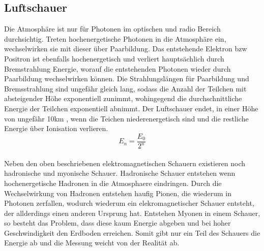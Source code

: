 \subsection{Luftschauer}
Die Atmosphäre ist nur für Photonen im optischen und radio Bereich durchsichtig. Treten hochenergetische Photonen in die Atmosphäre ein, wechselwirken sie mit dieser über Paarbildung. Das entstehende Elektron bzw Positron ist ebenfalls hochenergetisch und verliert hauptsächlich durch Bremstrahlung Energie, worauf die entstehenden Photonen wieder durch Paarbildung wechselwirken können. Die Strahlungslängen für Paarbildung und Bremsstrahlung sind ungefähr gleich lang, sodass die Anzahl der Teilchen mit absteigender Höhe exponentiell zunimmt, wohingegend die durchschnittliche Energie der Teilchen exponentiell abnimmt. Der Luftschauer endet, in einer Höhe von ungefähr 10km 
\cite{iwas}, wenn die Teichen niederenergetisch sind und die restliche Energie über Ionisation verlieren.
\begin{equation}
E_n=\frac{E_0}{2^n}
\end{equation}\\
Neben den oben beschriebenen elektromagnetischen Schauern existieren noch hadronische und myonische Schauer. Hadronische Schauer entstehen wenn hochenergetische Hadronen in die Atmosphaere eindringen. Durch die Wechselwirkung von Hadronen entstehen haufig Pionen, die wiederum in Photonen zerfallen, wodurch wiederum ein elekromagnetischer Schauer entsteht, der allderdings einen anderen Ursprung hat. Entstehen Myonen in einem Schauer, so besteht das Problem, dass diese kaum Energie abgeben und bei hoher Geschwindigkeit den Erdboden erreichen. Somit gibt nur ein Teil des Schauers die Energie ab und die Messung weicht von der Realität ab.

